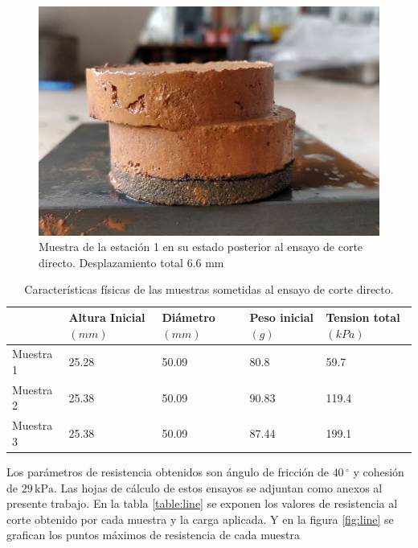 \begin{figure}[H]
\centering
\includegraphics[scale=1]{img/fallada.jpg}
\caption{Muestra de la estaci\'on 1 en su estado posterior al ensayo de corte directo.  Desplazamiento total 6.6 mm}
\label{fig:toma-bloque}
\end{figure}


\begin{table}[H]
\centering
\caption{Caracter\'isticas f\'isicas de las muestras sometidas al ensayo de corte directo. }
\begin{tabular}{l|l|l|l|l|}
\cline{2-5}
                                & Altura Inicial $\left( mm \right) $ &  Di\'ametro $\left( mm \right) $ & Peso inicial $\left( g \right) $ & Tension total$\left( kPa \right) $ \\ \hline
\multicolumn{1}{|l|}{Muestra 1} & 25.28          & 50.09    & 80.8             & 59.7               \\ \hline
\multicolumn{1}{|l|}{Muestra 2} & 25.38          & 50.09    & 90.83            & 119.4              \\ \hline
\multicolumn{1}{|l|}{Muestra 3} & 25.38          & 50.09    & 87.44            & 199.1              \\ \hline
\end{tabular}
\end{table}



Los par\'ametros de resistencia obtenidos son \'angulo de fricci\'on de \(40\,^\circ\) y cohesi\'on de \(29\,\text{kPa}\). Las hojas de c\'alculo de estos ensayos se adjuntan como anexos al presente trabajo.
En la tabla \ref{table:line}  se exponen los valores de resistencia al corte obtenido por cada muestra  y la carga aplicada. Y en la figura \ref{fig:line} se grafican los puntos m\'aximos de resistencia de cada muestra



